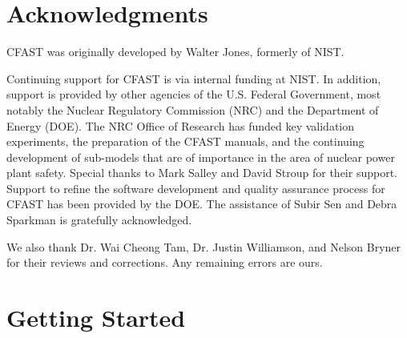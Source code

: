 \documentclass[12pt,twoside]{book}
\begin{document}

%
%

\chapter{Acknowledgments}

\label{acksection}

CFAST was originally developed by Walter Jones, formerly of NIST.

Continuing support for CFAST is via internal funding at NIST. In addition, support is provided by other agencies of the U.S. Federal Government, most notably the Nuclear Regulatory Commission (NRC) and the Department of Energy (DOE). The NRC Office of Research has funded key validation experiments, the preparation of the CFAST manuals, and the continuing development of sub-models that are of importance in the area of nuclear power plant safety. Special thanks to Mark Salley and David Stroup for their support. Support to refine the software development and quality assurance process for CFAST has been provided by the DOE. The assistance of Subir Sen and Debra Sparkman is gratefully acknowledged.

We also thank Dr. Wai Cheong Tam, Dr. Justin Williamson, and Nelson Bryner for their reviews and corrections. Any remaining errors are ours.

\cleardoublepage
\tableofcontents

\clearpage
\listoffigures

\listoftables


\mainmatter

%
%

\chapter{Getting Started}
\end{document}
